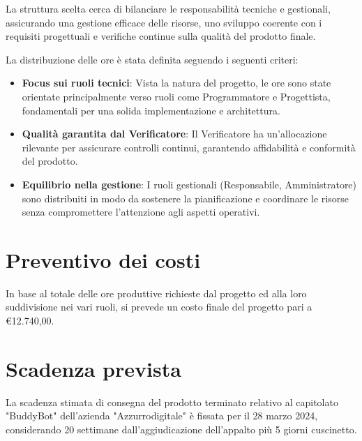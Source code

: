 \documentclass[italian, 12pt]{article}
\begin{document}
La struttura scelta cerca di bilanciare le responsabilità tecniche e gestionali, assicurando una gestione efficace delle risorse, uno sviluppo coerente con i requisiti progettuali e verifiche continue sulla qualità del prodotto finale. 

La distribuzione delle ore è stata definita seguendo i seguenti criteri:
\begin{itemize}
    \item \textbf{Focus sui ruoli tecnici}: Vista la natura del progetto, le ore sono state orientate principalmente verso ruoli come Programmatore e Progettista, fondamentali per una solida implementazione e architettura.
    \item \textbf{Qualità garantita dal Verificatore}: Il Verificatore ha un’allocazione rilevante per assicurare controlli continui, garantendo affidabilità e conformità del prodotto.
    \item \textbf{Equilibrio nella gestione}: I ruoli gestionali (Responsabile, Amministratore) sono distribuiti in modo da sostenere la pianificazione e coordinare le risorse senza compromettere l’attenzione agli aspetti operativi.
\end{itemize}


\section{Preventivo dei costi}
In base al totale delle ore produttive richieste dal progetto ed alla loro suddivisione nei vari ruoli, si prevede un costo finale del progetto pari a €12.740,00.

\section{Scadenza prevista}
La scadenza stimata di consegna del prodotto terminato relativo al capitolato "BuddyBot" dell'azienda "Azzurrodigitale" è fissata per il 28 marzo 2024, considerando 20 settimane dall'aggiudicazione dell'appalto più 5 giorni cuscinetto.
\end{document}
